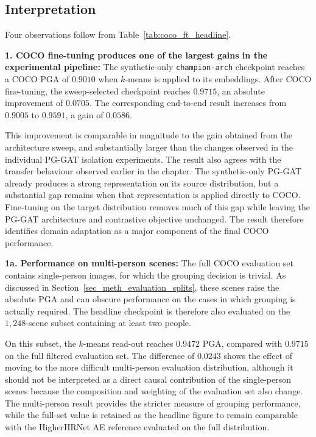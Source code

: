 \subsection{Interpretation}
\label{sec_res_coco_ft_discussion}

Four observations follow from Table~\ref{tab:coco_ft_headline}.

\textbf{1. COCO fine-tuning produces one of the largest gains in the
experimental pipeline:}
The synthetic-only \texttt{champion-arch} checkpoint reaches a COCO
PGA of $0.9010$ when $k$-means is applied to its embeddings.
After COCO fine-tuning, the sweep-selected checkpoint reaches $0.9715$,
an absolute improvement of $0.0705$.
The corresponding end-to-end result increases from $0.9005$ to $0.9591$,
a gain of $0.0586$.

This improvement is comparable in magnitude to the gain obtained from
the architecture sweep,
and substantially larger than the changes observed in the individual
PG-GAT isolation experiments.
The result also agrees with the transfer behaviour observed earlier
in the chapter.
The synthetic-only PG-GAT already produces a strong representation
on its source distribution,
but a substantial gap remains when that representation is applied
directly to COCO.
Fine-tuning on the target distribution removes much of this gap
while leaving the PG-GAT architecture and contrastive objective unchanged.
The result therefore identifies domain adaptation as a major component
of the final COCO performance.

\textbf{1a. Performance on multi-person scenes:}
The full COCO evaluation set contains single-person images,
for which the grouping decision is trivial.
As discussed in Section~\ref{sec_meth_evaluation_splits},
these scenes raise the absolute PGA and can obscure performance
on the cases in which grouping is actually required.
The headline checkpoint is therefore also evaluated on the $1{,}248$-scene
subset containing at least two people.

On this subset, the $k$-means read-out reaches $0.9472$ PGA,
compared with $0.9715$ on the full filtered evaluation set.
The difference of $0.0243$ shows the effect of moving to the more
difficult multi-person evaluation distribution,
although it should not be interpreted as a direct causal contribution
of the single-person scenes because the composition and weighting
of the evaluation set also change.
The multi-person result provides the stricter measure of grouping
performance,
while the full-set value is retained as the headline figure
to remain comparable with the HigherHRNet AE reference evaluated
on the full distribution.

